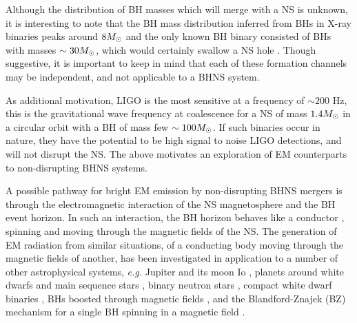Although the distribution of BH masses which will merge with
a NS is unknown, it is interesting to note that the BH mass distribution
inferred from BHs in X-ray binaries peaks around $8 {M_{\odot}}$ \citep{Ozel:2010}
and the only known BH binary consisted of BHs with masses $\sim 30 {M_{\odot}}$, which
would certainly swallow a NS hole \citep{GW150914:2016}. Though suggestive, it is important to keep
in mind that each of these formation channels may be independent, and not
applicable to a BHNS system.

As additional motivation, LIGO is the most sensitive at a frequency of $\sim
200$ Hz, this is the gravitational wave frequency at coalescence for a NS of
mass $1.4 {M_{\odot}}$ in a circular orbit with a BH of mass few $\sim100
{M_{\odot}}$. If such binaries occur in nature, they have the potential to be high
signal to noise LIGO detections, and will not disrupt the NS. The
above motivates an exploration of EM counterparts to non-disrupting BHNS
systems.


A possible pathway for bright EM emission by non-disrupting BHNS mergers is
through the electromagnetic interaction of the NS magnetosphere and the BH
event horizon. In such an interaction, the BH horizon behaves like a conductor
\citep[see][and Chapter \ref{ch:Rindler}]{MPBook}, spinning and moving through
the magnetic fields of the NS. The generation of EM radiation from similar
situations, of a conducting body moving through the magnetic fields of
another, has been investigated in application to a number of other
astrophysical systems, \textit{e.g.} Jupiter and its moon Io \citep{GLB:1969},
planets around white dwarfs \citep{Li:1998} and main sequence stars
\citep{LaineLinI:2012,LaineLinII:2012}, binary neutron stars
\citep{Vietri:1996,Piro:2012, DLai:2012, Palenzuela:2013}, compact white dwarf
binaries \citep{Wu:2002, Dall'Osso:2006, Dall'Osso:2007, DLai:2012}, BHs
boosted through magnetic fields \citep{Lyut:2011, Penna:2015}, and the
Blandford-Znajek (BZ) mechanism \citep{BZ:1977} for a single BH spinning in a
magnetic field  \citep[for recent numerical work on the BZ mechanism see \textit{e.g.}][]{PalenzuelaBZ:2011, Kiuchi:2015}.


